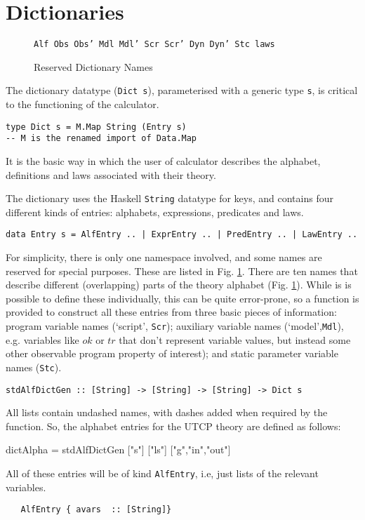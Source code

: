 \section{Dictionaries}\label{sec:Dictionaries}

\begin{figure}
  \centering
\texttt{Alf Obs Obs' Mdl Mdl' Scr Scr' Dyn Dyn' Stc laws}
  \caption{Reserved Dictionary Names}\label{fig:rsvd-names}
\end{figure}

The dictionary datatype (\texttt{Dict s}),
parameterised with a generic type \texttt{s},
is critical to the functioning of the calculator.
\begin{verbatim}
type Dict s = M.Map String (Entry s)
-- M is the renamed import of Data.Map
\end{verbatim}
It is the basic way in which the user of calculator
describes the alphabet, definitions and laws associated with their theory.

The dictionary uses the Haskell \texttt{String} datatype for keys,
and contains four different kinds of entries: alphabets,
expressions, predicates and laws.
{\small
\begin{verbatim}
data Entry s = AlfEntry .. | ExprEntry .. | PredEntry .. | LawEntry ..
\end{verbatim}
}
For simplicity, there is only one namespace involved,
and some names are reserved for special purposes.
These are listed in Fig. \ref{fig:rsvd-names}.
There are ten names that describe different
(overlapping)
parts of the theory alphabet (Fig. \ref{fig:rsvd-names}).
While is is possible to define these individually,
this can be quite error-prone,
so a function is provided to construct all these entries
from three basic pieces of information:
program variable names (`script', \texttt{Scr});
auxiliary variable names (`model',\texttt{Mdl}),
e.g. variables like $ok$ or $tr$ that don't represent variable values,
but instead some other observable program property of interest);
and static parameter variable names (\texttt{Stc}).
\begin{verbatim}
stdAlfDictGen :: [String] -> [String] -> [String] -> Dict s
\end{verbatim}
All lists contain undashed names, with dashes added when required
by the function.
So, the alphabet entries for the UTCP theory are defined as follows:
\begin{code}
dictAlpha = stdAlfDictGen ["s"] ["ls"] ["g","in","out"]
\end{code}
All of these entries will be of kind \texttt{AlfEntry},
i.e, just lists of the relevant variables.
\begin{verbatim}
   AlfEntry { avars  :: [String]}
\end{verbatim}


